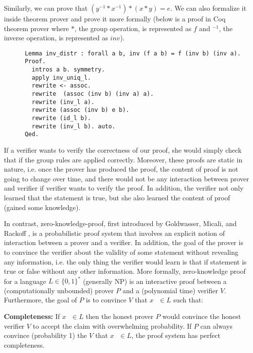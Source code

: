      \noindent
      Similarly, we can prove that $(y^{-1} * x^{-1}) *   (x * y) = e $.
      We can also formalize it inside theorem prover and prove it more formally (below is a proof in Coq theorem prover where 
      $*$, the group operation, is represented as $f$ and $^{-1}$, the inverse operation, is represented as $inv$).
      
      \begin{verbatim}
      Lemma inv_distr : forall a b, inv (f a b) = f (inv b) (inv a).
      Proof.
        intros a b. symmetry. 
        apply inv_uniq_l.
        rewrite <- assoc.
        rewrite  (assoc (inv b) (inv a) a).
        rewrite (inv_l a).
        rewrite (assoc (inv b) e b).
        rewrite (id_l b).
        rewrite (inv_l b). auto.
      Qed.
      \end{verbatim}
     
     If a verifier wants to verify the correctness of our proof,  she would simply check that if the group rules are applied correctly. 
     Moreover, these proofs 
     are static in nature, i.e. once the prover has produced the proof,  the content of proof is not going to change over time, and
     there would not be any interaction between prover and verifier if verifier wants to verify the proof.  In addition, the verifier 
     not only learned that the statement is true, but she also learned the content of proof (gained some knowledge).
     
     In contrast, zero-knowledge-proof, first introduced by Goldwasser, Micali, and Rackoff \citep{Goldwasser:1985:STOC}, 
     is a probabilistic proof system that involves an explicit notion of  interaction between 
     a prover and a verifier. In addition, 
     the goal of the prover is to convince the verifier about the validity of some statement without revealing any information, i.e. 
     the only thing the verifier would learn is that if statement is true or false without any other information. 
     More formally, zero-knowledge proof for a language $L \in \{0, 1\}^{*} $ (generally NP) is an interactive proof  
     between a (computationally unbounded) prover $P$ and a (polynomial time) verifier $V$. Furthermore, 
     the goal of $P$ is to convince $V$ that $x \text{  } \in L$  such that:
   
     \textbf{Completeness:} If $x \text{  } \in  L$ then the honest prover $P$ would convince the 
       honest verifier $V$ to accept the claim with overwhelming probability. 
       If $P$ can always convince (probability 1) the $V$ that $x \text{  }\in L$, the proof system has perfect completeness. 
    
